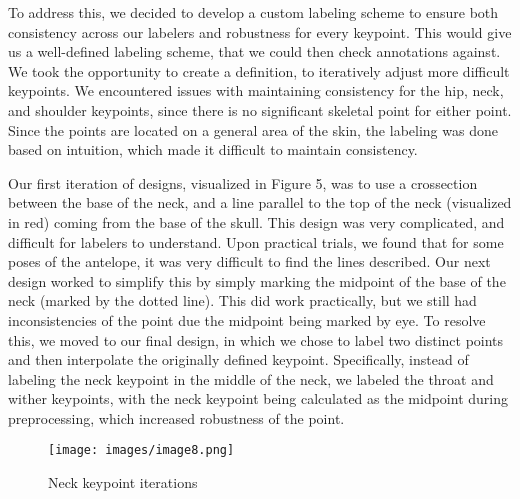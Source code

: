 \documentclass[conference]{IEEEtran}
\begin{document}
To address this, we decided to develop a custom labeling scheme to ensure both consistency across our labelers and robustness for every keypoint. This would give us a well-defined labeling scheme, that we could then check annotations against. We took the opportunity to create a definition, to iteratively adjust more difficult keypoints.
We encountered issues with maintaining consistency for the hip, neck, and shoulder keypoints, since there is no significant skeletal point for either point. Since the points are located on a general area of the skin, the labeling was done based on intuition, which made it difficult to maintain consistency.

Our first iteration of designs, visualized in Figure 5, was to use a crossection between the base of the neck, and a line parallel to the top of the neck (visualized in red) coming from the base of the skull. This design was very complicated, and difficult for labelers to understand. Upon practical trials, we found that for some poses of the antelope, it was very difficult to find the lines described. Our next design worked to simplify this by simply marking the midpoint of the base of the neck (marked by the dotted line). This did work practically, but we still had inconsistencies of the point due the midpoint being marked by eye. To resolve this, we moved to our final design, in which we chose to label two distinct points and then interpolate the originally defined keypoint.
Specifically, instead of labeling the neck keypoint in the middle of the neck, we labeled the throat and wither keypoints, with the neck keypoint being calculated as the midpoint during preprocessing, which increased robustness of the point.

\begin{figure}[htbp]
    \centerline{\texttt{[image: images/image8.png]}}
    \caption{Neck keypoint iterations}
    \label{fig:example}
\end{figure}
\end{document}
